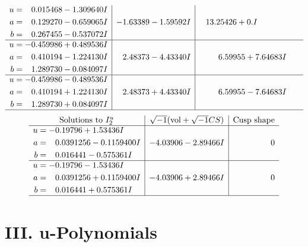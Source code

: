 \documentclass[1p]{elsarticle_modified}
\theoremstyle{definition}
\newcommand{\I}{\sqrt{-1}}
\begin{document}
$$\begin{array}{c|c|c}
\begin{aligned}
u &= \phantom{-}0.015468 - 1.309640 I \\
a &= \phantom{-}0.129270 - 0.659065 I \\
b &= \phantom{-}0.267455 - 0.537072 I\end{aligned}
 & -1.63389 - 1.59592 I & \phantom{-}13.25426 + 0. I\phantom{ +0.000000I} \\ \hline\begin{aligned}
u &= -0.459986 + 0.489536 I \\
a &= \phantom{-}0.410194 - 1.224130 I \\
b &= \phantom{-}1.289730 - 0.084097 I\end{aligned}
 & \phantom{-}2.48373 - 4.43340 I & \phantom{-}6.59955 + 7.64683 I \\ \hline\begin{aligned}
u &= -0.459986 - 0.489536 I \\
a &= \phantom{-}0.410194 + 1.224130 I \\
b &= \phantom{-}1.289730 + 0.084097 I\end{aligned}
 & \phantom{-}2.48373 + 4.43340 I & \phantom{-}6.59955 - 7.64683 I\\
 \hline 
 \end{array}$$\newpage$$\begin{array}{c|c|c}  
\text{Solutions to }I^u_{2}& \I (\text{vol} + \sqrt{-1}CS) & \text{Cusp shape}\\
 \hline 
\begin{aligned}
u &= -0.19796 + 1.53436 I \\
a &= \phantom{-}0.0391256 - 0.1159400 I \\
b &= \phantom{-}0.016441 - 0.575361 I\end{aligned}
 & -4.03906 - 2.89466 I & \phantom{-0.000000 } 0 \\ \hline\begin{aligned}
u &= -0.19796 - 1.53436 I \\
a &= \phantom{-}0.0391256 + 0.1159400 I \\
b &= \phantom{-}0.016441 + 0.575361 I\end{aligned}
 & -4.03906 + 2.89466 I & \phantom{-0.000000 } 0\\
 \hline 
 \end{array}$$\newpage
\newpage\renewcommand{\arraystretch}{1}
\centering \section*{ III. u-Polynomials}
\end{document}
